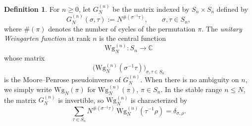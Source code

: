 \documentclass[11pt,a4paper,reqno]{article}
\theoremstyle{definition}
\newtheorem{definition}[theorem]{Definition}
\theoremstyle{remark}
\begin{document}
\begin{definition}
For $n\geq 0$, let $G_N^{(n)}$ be the matrix indexed by $S_n\times S_n$ defined by
\[
G_N^{(n)}(\sigma,\tau):=N^{\#(\sigma^{-1}\tau)},\qquad \sigma,\tau\in S_n,
\]
where $\#(\pi)$ denotes the number of cycles of the permutation $\pi$. The \emph{unitary Weingarten function} at rank $n$ is the central function
\[
\mathrm{Wg}_N^{(n)}:S_n\to \mathbb C
\]
whose matrix
\[
\bigl(\mathrm{Wg}_N^{(n)}(\sigma^{-1}\tau)\bigr)_{\sigma,\tau\in S_n}
\]
is the Moore--Penrose pseudoinverse of $G_N^{(n)}$. When there is no ambiguity on $n$, we simply write $\mathrm{Wg}_N(\pi)$ for $\mathrm{Wg}_N^{(n)}(\pi)$, $\pi\in S_n$.
In the stable range $n\leq N$, the matrix $G_N^{(n)}$ is invertible, so $\mathrm{Wg}_N^{(n)}$ is characterized by
\[
\sum_{\tau\in S_n} N^{\#(\sigma^{-1}\tau)}\,\mathrm{Wg}_N^{(n)}(\tau^{-1}\rho)=\delta_{\sigma,\rho}.
\]
\end{definition}
\end{document}
